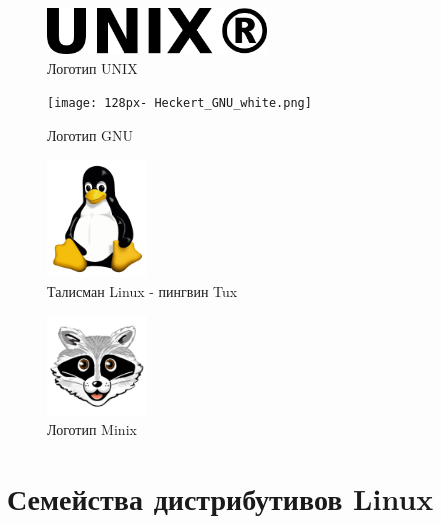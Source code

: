 \documentclass[bachelor, och, referat, times]{SCWorks}
\begin{document}
\begin{figure}[h]
    \centering
    \includegraphics[width=220px]{UNIX.png}
    \caption{Логотип UNIX}
    \label{fig:UNIX_symbol}
\end{figure}

\begin{figure}[h]
    \centering
    \texttt{[image: 128px-
    Heckert\_GNU\_white.png]}
    \caption{Логотип GNU}
    \label{fig:GNU_symbol}
\end{figure}

\begin{figure}[t]
    \centering
    \includegraphics[width=100px]{Tux.png}
    \caption{Талисман Linux - пингвин Tux}
    \label{fig:linux_symbol}
\end{figure}

\begin{figure}[t]
    \centering
    \includegraphics[width=100px]{BVXyPwe.png}
    \caption{Логотип Minix}
    \label{fig:minix_symbol}
\end{figure}

\section{Семейства дистрибутивов Linux}
\end{document}
